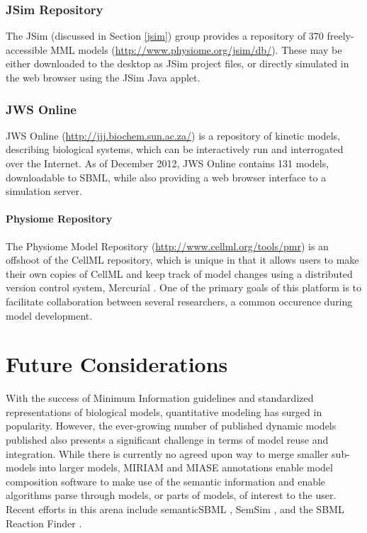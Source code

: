 \subsubsection{JSim Repository}

The JSim (discussed in Section \ref{jsim}) group provides a repository
of 370 freely-accessible MML models
(\url{http://www.physiome.org/jsim/db/}). These may be either downloaded
to the desktop as JSim project files, or directly simulated in the web
browser using the JSim Java applet.

\subsubsection{JWS Online}

JWS Online (\url{http://jjj.biochem.sun.ac.za/})
\autocite{olivier2004web} is a repository of kinetic models, describing
biological systems, which can be interactively run and interrogated over
the Internet. As of December 2012, JWS Online contains 131 models,
downloadable to SBML, while also providing a web browser interface to a
simulation server.

\paragraph{Physiome Repository}

The Physiome Model Repository (\url{http://www.cellml.org/tools/pmr})
\autocite{yu2011physiome} is an offshoot of the CellML repository, which
is unique in that it allows users to make their own copies of CellML and
keep track of model changes using a distributed version control system,
Mercurial \autocite{o2007distributed}. One of the primary goals of this
platform is to facilitate collaboration between several researchers, a
common occurence during model development.

\section{Future Considerations}

With the success of Minimum Information guidelines and standardized
representations of biological models, quantitative modeling has surged
in popularity. However, the ever-growing number of published dynamic
models published also presents a significant challenge in terms of model
reuse and integration. While there is currently no agreed upon way to
merge smaller sub- models into larger models, MIRIAM and MIASE
annotations enable model composition software to make use of the
semantic information and enable algorithms parse through models, or
parts of models, of interest to the user. Recent efforts in this arena
include semanticSBML \autocite{krause2010annotation}, SemSim
\autocite{neal2009advances}, and the SBML Reaction Finder
\autocite{neal2012sbml}.

